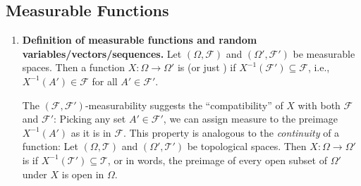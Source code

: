 \subsection{Measurable Functions}
\begin{enumerate}
\item \textbf{Definition of measurable functions and random
variables/vectors/sequences.} Let \((\Omega,\mathcal{F})\) and
\((\Omega',\mathcal{F}')\) be measurable spaces.  Then a function
\(X:\Omega\to\Omega'\) is  (or
just ) if \(X^{-1}(\mathcal{F}')\subseteq \mathcal{F}\), i.e.,
\(X^{-1}(A')\in\mathcal{F}\) for all \(A'\in\mathcal{F}'\).

\begin{intuition}
The \((\mathcal{F},\mathcal{F}')\)-measurability suggests the ``compatibility''
of \(X\) with both \(\mathcal{F}\) and \(\mathcal{F}'\): Picking any set
\(A'\in\mathcal{F}'\), we can assign measure to the preimage \(X^{-1}(A')\) as
it is in \(\mathcal{F}\). This property is analogous to the \emph{continuity}
of a function: Let \((\Omega,\mathcal{T})\) and \((\Omega',\mathcal{T}')\) be
topological spaces. Then \(X:\Omega\to\Omega'\) is  if
\(X^{-1}(\mathcal{T}')\subseteq \mathcal{T}\), or in words, the preimage of
every open subset of \(\Omega'\) under \(X\) is open in \(\Omega\).
\end{intuition}


\end{enumerate}
